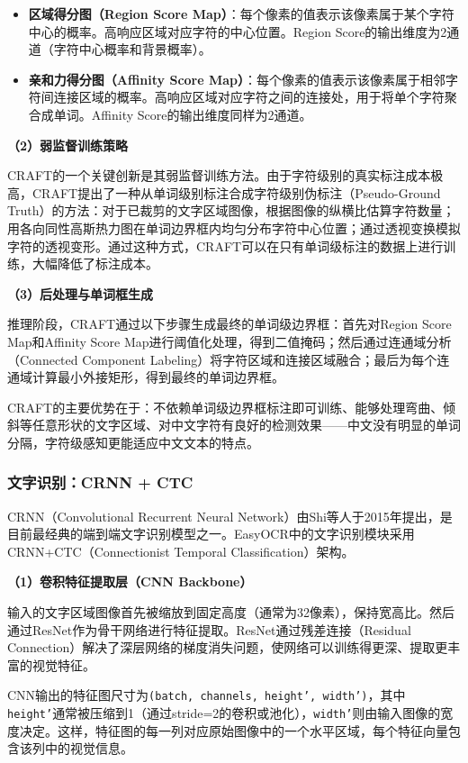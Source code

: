 \documentclass[12pt,hyperref,a4paper,UTF8]{ctexart}
\begin{document}
\begin{itemize}
    \item \textbf{区域得分图（Region Score Map）}：每个像素的值表示该像素属于某个字符中心的概率。高响应区域对应字符的中心位置。Region Score的输出维度为2通道（字符中心概率和背景概率）。
    \item \textbf{亲和力得分图（Affinity Score Map）}：每个像素的值表示该像素属于相邻字符间连接区域的概率。高响应区域对应字符之间的连接处，用于将单个字符聚合成单词。Affinity Score的输出维度同样为2通道。
\end{itemize}

\textbf{（2）弱监督训练策略}

CRAFT的一个关键创新是其弱监督训练方法。由于字符级别的真实标注成本极高，CRAFT提出了一种从单词级别标注合成字符级别伪标注（Pseudo-Ground Truth）的方法：对于已裁剪的文字区域图像，根据图像的纵横比估算字符数量；用各向同性高斯热力图在单词边界框内均匀分布字符中心位置；通过透视变换模拟字符的透视变形。通过这种方式，CRAFT可以在只有单词级标注的数据上进行训练，大幅降低了标注成本。

\textbf{（3）后处理与单词框生成}

推理阶段，CRAFT通过以下步骤生成最终的单词级边界框：首先对Region Score Map和Affinity Score Map进行阈值化处理，得到二值掩码；然后通过连通域分析（Connected Component Labeling）将字符区域和连接区域融合；最后为每个连通域计算最小外接矩形，得到最终的单词边界框。

CRAFT的主要优势在于：不依赖单词级边界框标注即可训练、能够处理弯曲、倾斜等任意形状的文字区域、对中文字符有良好的检测效果——中文没有明显的单词分隔，字符级感知更能适应中文文本的特点。

\subsubsection{文字识别：CRNN + CTC}

CRNN（Convolutional Recurrent Neural Network）由Shi等人于2015年提出，是目前最经典的端到端文字识别模型之一。EasyOCR中的文字识别模块采用CRNN+CTC（Connectionist Temporal Classification）架构。

\textbf{（1）卷积特征提取层（CNN Backbone）}

输入的文字区域图像首先被缩放到固定高度（通常为32像素），保持宽高比。然后通过ResNet作为骨干网络进行特征提取。ResNet通过残差连接（Residual Connection）解决了深层网络的梯度消失问题，使网络可以训练得更深、提取更丰富的视觉特征。

CNN输出的特征图尺寸为\texttt{(batch, channels, height', width')}，其中\texttt{height'}通常被压缩到1（通过stride=2的卷积或池化），\texttt{width'}则由输入图像的宽度决定。这样，特征图的每一列对应原始图像中的一个水平区域，每个特征向量包含该列中的视觉信息。
\end{document}
